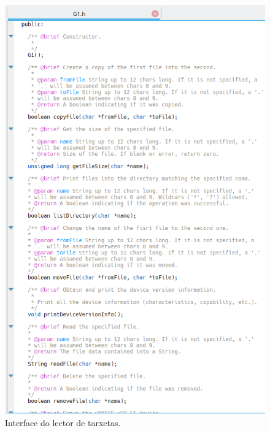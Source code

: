    \begin{figure}[htbp]
    \centering
    \includegraphics[scale=0.8,keepaspectratio=true]{./imagenes/interface-lector-tarxetas.png}
    \caption{Interface do lector de tarxetas.}
    \label{figura:InterfaceLectorTarxetas}
   \end{figure}
   
